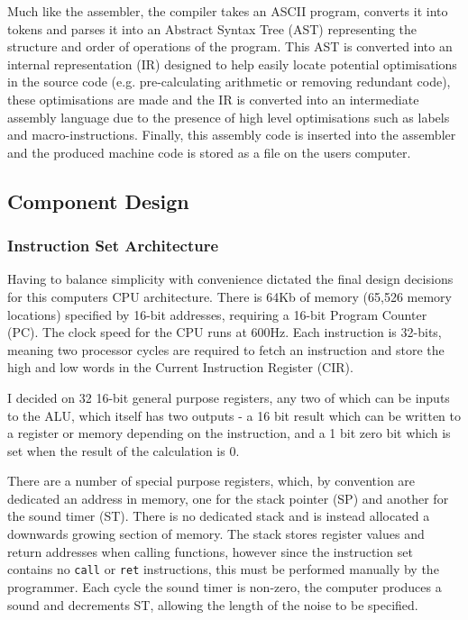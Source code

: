 \begin{samepage}

Much like the assembler, the compiler takes an ASCII program, converts it into tokens and parses it into an Abstract Syntax Tree (AST) representing the structure and order of operations of the program. This AST is converted into an internal representation (IR) designed to help easily locate potential optimisations in the source code (e.g. pre-calculating arithmetic or removing redundant code), these optimisations are made and the IR is converted into an intermediate assembly language due to the presence of high level optimisations such as labels and macro-instructions. Finally, this assembly code is inserted into the assembler and the produced machine code is stored as a file on the users computer. 

\end{samepage}

\bigskip

\subsection{Component Design}
\subsubsection{Instruction Set Architecture}

Having to balance simplicity with convenience dictated the final design decisions for this computers CPU architecture.  There is 64Kb of memory (65,526 memory locations) specified by 16-bit addresses, requiring a 16-bit Program Counter (PC). The clock speed for the CPU runs at 600Hz. Each instruction is 32-bits, meaning two processor cycles are required to fetch an instruction and store the high and low words in the Current Instruction Register (CIR). 

I decided on 32 16-bit general purpose registers, any two of which can be inputs to the ALU, which itself has two outputs - a 16 bit result which can be written to a register or memory depending on the instruction, and a 1 bit zero bit which is set when the result of the calculation is 0.

There are a number of special purpose registers, which, by convention are dedicated an address in memory, one for the stack pointer (SP) and another for the sound timer (ST). There is no dedicated stack and is instead allocated a downwards growing section of memory. The stack stores register values and return addresses when calling functions, however since the instruction set contains no \texttt{call} or \texttt{ret} instructions, this must be performed manually by the programmer. Each cycle the sound timer is non-zero, the computer produces a sound and decrements ST, allowing the length of the noise to be specified.

